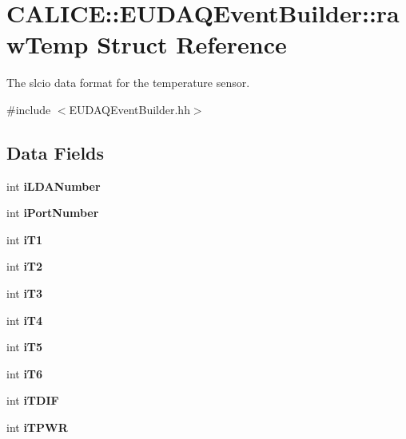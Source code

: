 \section{C\-A\-L\-I\-C\-E\-:\-:E\-U\-D\-A\-Q\-Event\-Builder\-:\-:raw\-Temp Struct Reference}
\label{structCALICE_1_1EUDAQEventBuilder_1_1rawTemp}


The slcio data format for the temperature sensor.  




{\ttfamily \#include $<$E\-U\-D\-A\-Q\-Event\-Builder.\-hh$>$}

\subsection*{Data Fields}
\begin{DoxyCompactItemize}
\item 
int {\bfseries i\-L\-D\-A\-Number}\label{structCALICE_1_1EUDAQEventBuilder_1_1rawTemp_a09d0088a0bff17680af4d362a2f3d68b}

\item 
int {\bfseries i\-Port\-Number}\label{structCALICE_1_1EUDAQEventBuilder_1_1rawTemp_ab3401099946c3a264e7a751dd838130c}

\item 
int {\bfseries i\-T1}\label{structCALICE_1_1EUDAQEventBuilder_1_1rawTemp_aeec77818c34b8a38dd955f352aad2ae3}

\item 
int {\bfseries i\-T2}\label{structCALICE_1_1EUDAQEventBuilder_1_1rawTemp_a0bdd1967940c9dbc2dcc55d888744ddb}

\item 
int {\bfseries i\-T3}\label{structCALICE_1_1EUDAQEventBuilder_1_1rawTemp_a639325966d678f86bbb316d43b32552a}

\item 
int {\bfseries i\-T4}\label{structCALICE_1_1EUDAQEventBuilder_1_1rawTemp_a74fd7f7987c580a6c08399f67f4cc50e}

\item 
int {\bfseries i\-T5}\label{structCALICE_1_1EUDAQEventBuilder_1_1rawTemp_a924de3c43a94649f9653e31ae17ff521}

\item 
int {\bfseries i\-T6}\label{structCALICE_1_1EUDAQEventBuilder_1_1rawTemp_acd61e0a8d4b8a1a7fa543f52685c95ce}

\item 
int {\bfseries i\-T\-D\-I\-F}\label{structCALICE_1_1EUDAQEventBuilder_1_1rawTemp_a04f59d0177aa2f4e9c4b423629a2793b}

\item 
int {\bfseries i\-T\-P\-W\-R}\label{structCALICE_1_1EUDAQEventBuilder_1_1rawTemp_ac56f6bbacdec1a4394317d45cc60e237}

\end{DoxyCompactItemize}


